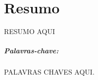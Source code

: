 \chapter*{Resumo}
\thispagestyle{empty}

RESUMO AQUI

\vspace{50pt}

\paragraph{Palavras-chave:} PALAVRAS CHAVES AQUI.
